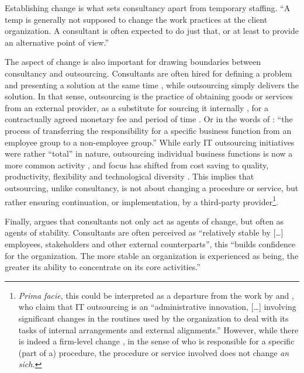 \documentclass[12pt]{article}
\begin{document}
Establishing change is what sets consultancy apart from temporary
staffing. ``A temp is generally not supposed to change the work
practices at the client organization. A consultant is often expected to
do just that, or at least to provide an alternative point of view.''
\citep[ 5]{furusten2000}

The aspect of change is also important for drawing boundaries between
consultancy and outsourcing. Consultants are often hired for defining a
problem and presenting a solution at the same time \citep[
272]{furusten2009}, while outsourcing simply delivers the solution. In
that sense, outsourcing is the practice of obtaining goods or services
from an external provider, as a substitute for sourcing it internally
\citep[ 2]{lacity2012}, for a contractually agreed monetary fee and
period of time \citep[ 20-21]{leimeister2010}. Or in the words of
\citet[374]{zhu2001}: ``the process of transferring the responsibility
for a specific business function from an employee group to a
non-employee group.'' While early IT outsourcing initiatives were rather
``total'' \citet{willcocks1995} in nature, outsourcing individual
business functions is now a more common activity \citep[ 377]{zhu2001},
and focus has shifted from cost saving to quality, productivity,
flexibility and technological diversity \citep[ 185]{kirilov2012}. This
implies that outsourcing, unlike consultancy, is not about changing a
procedure or service, but rather ensuring continuation, or
implementation, by a third-party provider\footnote{\emph{Prima facie},
  this could be interpreted as a departure from the work by
  \citet{loh1992} and \citet{venkatraman1994}, who claim that IT
  outsourcing is an ``administrative innovation, {[}\ldots{]} involving
  significant changes in the routines used by the organization to deal
  with its tasks of internal arrangements and external alignments.''
  However, while there is indeed a firm-level change \citep[
  14]{nelson1985}, in the sense of who is responsible for a specific
  (part of a) procedure, the procedure or service involved does not
  change \emph{an sich.}}.

Finally, \citet[272-273]{furusten2009} argues that consultants not only
act as agents of change, but often as agents of stability. Consultants
are often perceived as ``relatively stable by {[}\ldots{]} employees,
stakeholders and other external counterparts'', this ``builds confidence
for the organization. The more stable an organization is experienced as
being, the greater its ability to concentrate on its core activities.''
\end{document}

